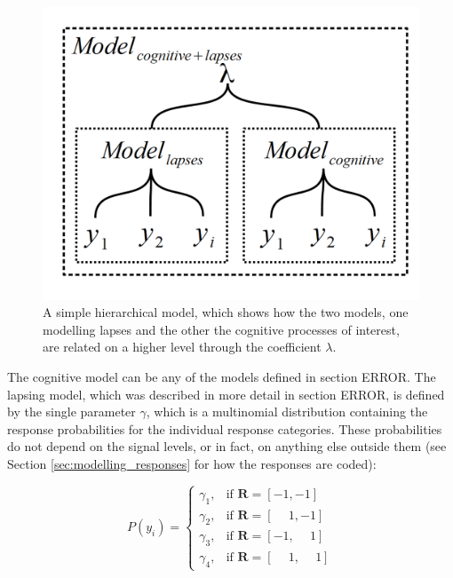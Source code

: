 \documentclass{article}\usepackage{knitr}
\begin{document}
\begin{figure}[!htb]
\begin{center}
\includegraphics[scale=0.75]{Basic_hierarchical_mixture_model}
\end{center}
\caption{A simple hierarchical model, which shows how the two models, one modelling lapses and the other the cognitive processes of interest, are related on a higher level through the coefficient $\lambda$.}
\label{fig:Basic_hierarchical_model}
\end{figure}

The cognitive model can be any of the models defined in section ERROR. The lapsing model, which was described in more detail in section ERROR, is defined by the single parameter $\gamma$, which is a multinomial distribution containing the response probabilities for the individual response categories. These probabilities do not depend on the signal levels, or in fact, on anything else outside them (see Section \ref{sec:modelling_responses} \textit{} for how the responses are coded):

\begin{equation}
P(y_i)=
\begin{cases}
  \gamma_1, & \text{if } \bm{R} = [-1, -1]\\
  \gamma_2, & \text{if } \bm{R} = [\phantom{-}1, -1]\\
  \gamma_3, & \text{if } \bm{R} = [-1, \phantom{-}1]\\
  \gamma_4, & \text{if } \bm{R} = [\phantom{-}1, \phantom{-}1]
\end{cases}
\end{equation}
\end{document}
